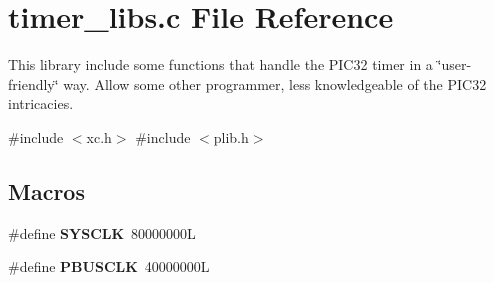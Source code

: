 \section{timer\+\_\+libs.\+c File Reference}
\label{timer__libs_8c}


This library include some functions that handle the P\+I\+C32 timer in a \char`\"{}user-\/friendly\char`\"{} way. Allow some other programmer, less knowledgeable of the P\+I\+C32 intricacies.  


{\ttfamily \#include $<$xc.\+h$>$}\newline
{\ttfamily \#include $<$plib.\+h$>$}\newline
\subsection*{Macros}
\begin{DoxyCompactItemize}
\item 
\#define \textbf{ S\+Y\+S\+C\+LK}~80000000L
\item 
\#define \textbf{ P\+B\+U\+S\+C\+LK}~40000000L
\end{DoxyCompactItemize}
